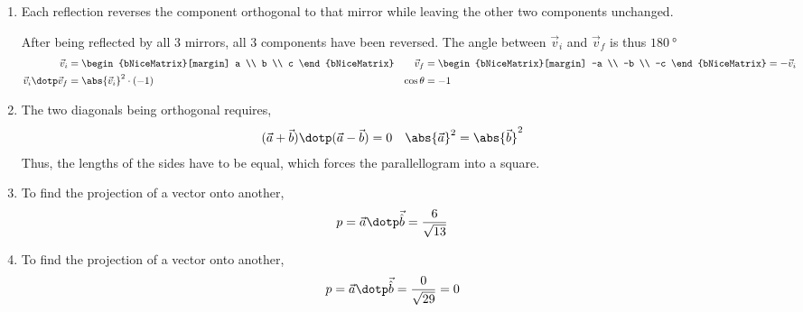 \begin{enumerate}
    \item Each reflection reverses the component orthogonal to that mirror while
          leaving the other two components unchanged. \par
          After being reflected by all 3 mirrors, all 3 components have been reversed.
          The angle between $ \vec{v}_i $ and $ \vec{v}_f $ is thus
          $ \SI{180}{\degree} $
          \begin{align}
              \vec{v}_i                 & = \begin{bNiceMatrix}[margin]
                                                a \\ b \\ c
                                            \end{bNiceMatrix}  &
              \vec{v}_f                 & = \begin{bNiceMatrix}[margin]
                                                -a \\ -b \\ -c
                                            \end{bNiceMatrix} = -\vec{v}_i \\
              \vec{v}_i \dotp \vec{v}_f & = \abs{\vec{v}_i}^2 \cdot (-1) &
              \cos \theta               & = -1
          \end{align}

    \item The two diagonals being orthogonal requires,
          \begin{align}
              (\vec{a} + \vec{b}) \dotp (\vec{a} - \vec{b}) & = 0               &
              \abs{\vec{a}}^2                               & = \abs{\vec{b}}^2
          \end{align}
          Thus, the lengths of the sides have to be equal, which forces the
          parallellogram into a square.

    \item To find the projection of a vector onto another,
          \begin{align}
              p & = \vec{a} \dotp \vec{\hat{b}} = \frac{6}{\sqrt{13}}
          \end{align}

    \item To find the projection of a vector onto another,
          \begin{align}
              p & = \vec{a} \dotp \vec{\hat{b}} = \frac{0}{\sqrt{29}} = 0
          \end{align}


\end{enumerate}
